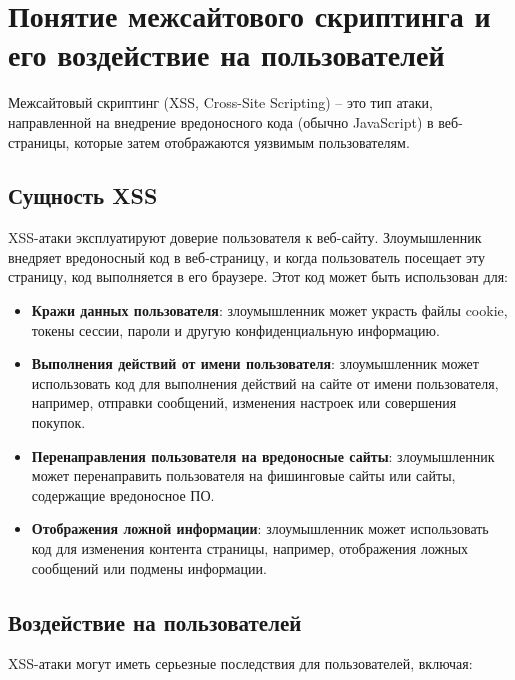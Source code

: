 \documentclass[a4paper,12pt]{diplom}
\begin{document}
	 \section{Понятие межсайтового скриптинга и его воздействие на пользователей}
	 
	 Межсайтовый скриптинг (XSS, Cross-Site Scripting) – это тип атаки, направленной на внедрение вредоносного кода (обычно JavaScript) в веб-страницы, которые затем отображаются уязвимым пользователям. 
	 
	 \subsection{Сущность XSS}
	 
	 XSS-атаки эксплуатируют доверие пользователя к веб-сайту. Злоумышленник внедряет вредоносный код в веб-страницу, и когда пользователь посещает эту страницу, код выполняется в его браузере. Этот код может быть использован для:
	 
	 \begin{itemize}
	 	\item \textbf{Кражи данных пользователя}: злоумышленник может украсть файлы cookie, токены сессии, пароли и другую конфиденциальную информацию.
	 	\item \textbf{Выполнения действий от имени пользователя}: злоумышленник может использовать код для выполнения действий на сайте от имени пользователя, например, отправки сообщений, изменения настроек или совершения покупок.
	 	\item \textbf{Перенаправления пользователя на вредоносные сайты}: злоумышленник может перенаправить пользователя на фишинговые сайты или сайты, содержащие вредоносное ПО.
	 	\item \textbf{Отображения ложной информации}: злоумышленник может использовать код для изменения контента страницы, например, отображения ложных сообщений или подмены информации. 
	 \end{itemize}
	 
	 \subsection{Воздействие на пользователей}
	 
	 XSS-атаки могут иметь серьезные последствия для пользователей, включая:
	 
\end{document}
